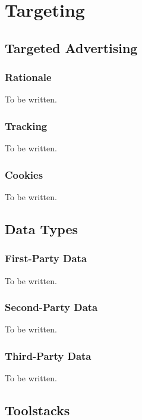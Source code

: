 %
%

\pagebreak
\section{Targeting}

\onehalfspacing

\subsection{Targeted Advertising}

\subsubsection{Rationale}

To be written.

\subsubsection{Tracking}

To be written.

\subsubsection{Cookies}

To be written.

\subsection{Data Types}

\subsubsection{First-Party Data}

To be written.

\subsubsection{Second-Party Data}

To be written.

\subsubsection{Third-Party Data}

To be written.

\subsection{Toolstacks}

